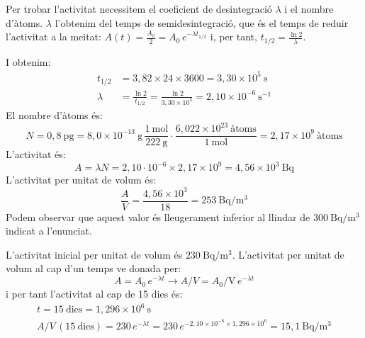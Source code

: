 \begin{solapartat}
 Per trobar l'activitat necessitem el coeficient de desintegració $\lambda$ i el nombre d'àtoms. $\lambda$ l'obtenim del temps de semidesintegració, que és el temps de reduir l'activitat a la meitat: $A(t) = \frac{A_0}{2} = A_0\,e^{-\lambda t_{1/2}}$ i, per tant, $t_{1/2} = \frac{\ln 2}{\lambda}$.

I obtenim:
\begin{align*}
t_{1/2} &= 3,82\times 24\times 3600 = 3,30\times 10^{5}\ \mathrm{s}\\
\lambda &= \frac{\ln 2}{t_{1/2}} = \frac{\ln 2}{3,30\times 10^{5}} = 2,10\times 10^{-6}\ \mathrm{s^{-1}}
\end{align*}
El nombre d'àtoms és:
\[ N = 0,8\ \mathrm{pg} = 8,0\times 10^{-13}\ \mathrm{g}\,\frac{1\ \mathrm{mol}}{222\ \mathrm{g}}\cdot\frac{6,022\times 10^{23}\ \text{àtoms}}{1\ \mathrm{mol}} = 2,17\times 10^{9}\ \text{àtoms} \]
L'activitat és:
\[ A = \lambda N = 2,10\cdot 10^{-6}\times 2,17\times 10^{9} = 4,56\times 10^{3}\ \mathrm{Bq} \]
 L'activitat per unitat de volum és:
\[ \frac{A}{V} = \frac{4,56\times 10^{3}}{18} = 253\ \mathrm{Bq/m^3} \]
Podem observar que aquest valor és lleugerament inferior al llindar de $300\ \mathrm{Bq/m^3}$ indicat a l'enunciat.

 L'activitat inicial per unitat de volum és $230\ \mathrm{Bq/m^3}$. L'activitat per unitat de volum al cap d'un temps ve donada per:
\[ A = A_0\,e^{-\lambda t} \rightarrow A/V = A_0/\mathrm{V}\,e^{-\lambda t} \]
i per tant l'activitat al cap de 15 dies és:
\begin{gather*}
t = 15\ \text{dies} = 1,296\times 10^{6}\ \mathrm{s}\\
A/V\,(15\ \text{dies}) = 230\,e^{-\lambda t} = 230\,e^{-2,10\times 10^{-6}\times 1,296\times 10^{6}} = 15,1\ \mathrm{Bq/m^3}
\end{gather*}
\end{solapartat}
